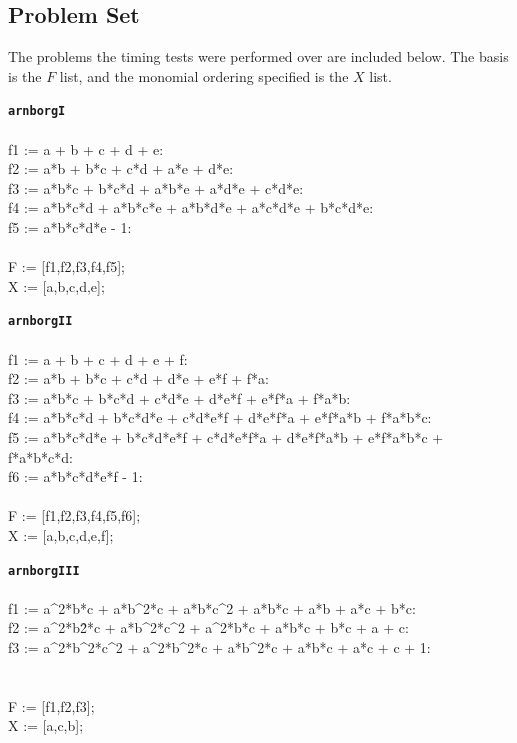 \documentclass[letterpaper,12pt,titlepage,oneside,final]{book}
\newenvironment{codefont}{\ttfamily}{\par}
\begin{document}
\begin{appendices}
\chapter{Problem Set}\label{probSet}

The problems the timing tests were performed over are included below.  The basis is the $F$ list, and the monomial ordering specified is the $X$ list.  

\singlespacing

\noindent\textbf{\texttt{arnborgI}}\\\\
\noindent\begin{codefont}
  f1 := a + b + c + d + e:\\
  f2 := a*b + b*c + c*d + a*e + d*e:\\
  f3 := a*b*c + b*c*d + a*b*e + a*d*e + c*d*e:\\
  f4 := a*b*c*d + a*b*c*e + a*b*d*e + a*c*d*e + b*c*d*e:\\
  f5 := a*b*c*d*e - 1:\\
  \\
  F := [f1,f2,f3,f4,f5];\\
  X := [a,b,c,d,e];\\
\end{codefont}

\noindent\textbf{\texttt{arnborgII}}\\\\
\noindent\begin{codefont}
  f1 := a + b + c + d + e + f:
  \\f2 := a*b + b*c + c*d + d*e + e*f + f*a:
  \\f3 := a*b*c + b*c*d + c*d*e + d*e*f  + e*f*a + f*a*b:
  \\f4 := a*b*c*d + b*c*d*e + c*d*e*f + d*e*f*a + e*f*a*b + f*a*b*c:
  \\f5 := a*b*c*d*e + b*c*d*e*f + c*d*e*f*a + d*e*f*a*b + e*f*a*b*c + f*a*b*c*d:
  \\f6 := a*b*c*d*e*f - 1:
\\
  \\F := [f1,f2,f3,f4,f5,f6];
  \\X := [a,b,c,d,e,f];\\
\end{codefont}

\noindent\textbf{\texttt{arnborgIII}}\\\\
\noindent\begin{codefont}
  f1 := a\^{}2*b*c + a*b\^{}2*c + a*b*c\^{}2 + a*b*c + a*b + a*c + b*c:
  \\f2 := a\^{}2*b\^2*c + a*b\^{}2*c\^{}2 + a\^{}2*b*c + a*b*c + b*c + a + c:
  \\f3 := a\^{}2*b\^{}2*c\^{}2 + a\^{}2*b\^{}2*c + a*b\^{}2*c + a*b*c + a*c + c + 1:\\
  \\
  \\F := [f1,f2,f3];
  \\X := [a,c,b];
\end{codefont}


\end{appendices}
\end{document}
